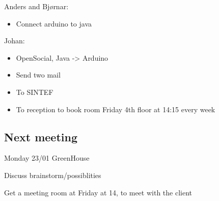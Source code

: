 Anders and Bjørnar:
\begin{itemize}
\item Connect arduino to java
\end{itemize}


Johan:
\begin{itemize}
\item OpenSocial, Java -> Arduino
\item Send two mail
\item To SINTEF
\item To reception to book room Friday 4th floor at 14:15 every week
\end{itemize}

\subsection{Next meeting}
Monday 23/01 GreenHouse

Discuss brainstorm/possiblities

Get a meeting room at Friday at 14, to meet with the client